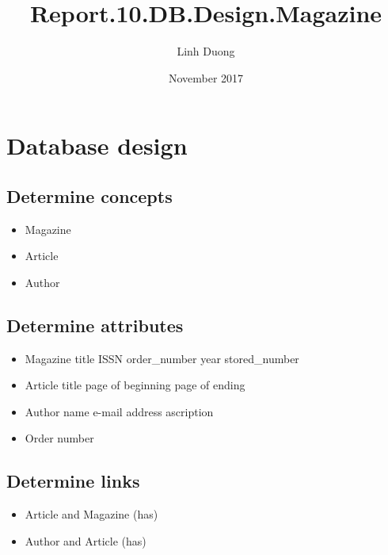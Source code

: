 \documentclass{article}
\title{Report.10.DB.Design.Magazine}
\author{Linh Duong}
\date{November 2017}
\begin{document}
\maketitle

\section{Database design}
\subsection{Determine concepts}
\begin{itemize}
    \item Magazine
    \item Article
    \item Author
\end{itemize}

\subsection{Determine attributes}
\begin{itemize}
    \item Magazine
    \subitem title
    \subitem ISSN
    \subitem order\_number
    \subitem year
    \subitem stored\_number
    
    \item Article
    \subitem title
    \subitem page of beginning
    \subitem page of ending 
    
    \item Author
    \subitem name
    \subitem e-mail address
    \subitem ascription
    
    \item Order
    \subitem number
\end{itemize}

\subsection{Determine links}
\begin{itemize}
    \item Article and Magazine (has)
    \item Author and Article (has)
\end{itemize}
\end{document}
